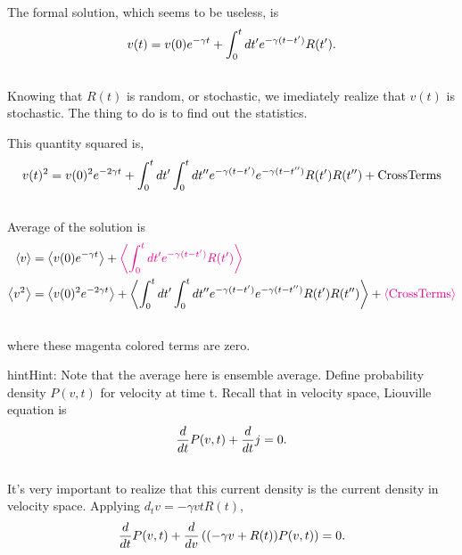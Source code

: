 \documentclass[letterpaper,10pt,english]{sphinxmanual}
\newcommand{\avg}[1]{\left< #1 \right>}
\begin{document}
The formal solution, which seems to be useless, is
\begin{gather}
\begin{split}v(t) = v(0)e^{-\gamma t} + \int_0^t dt' e^{-\gamma (t-t')} R(t') .\end{split}\notag\\\begin{split}\end{split}\notag
\end{gather}
Knowing that $R(t)$ is random, or stochastic, we imediately realize that $v(t)$ is stochastic. The thing to do is to find out the statistics.

This quantity squared is,
\begin{gather}
\begin{split}v(t)^2 = v(0)^2 e^{-2\gamma t} + \int_0^t dt'\int_0^t dt'' e^{-\gamma (t- t')} e^{-\gamma (t - t'')} R(t')R(t'') + \mathrm{Cross Terms}\end{split}\notag\\\begin{split}\end{split}\notag
\end{gather}
Average of the solution is
\begin{gather}
\begin{split}\avg{v} &= \avg{v(0)e^{-\gamma t}} + {\color{magenta}\avg{\int_0^t dt' e^{-\gamma (t-t')} R(t') } } \\
\avg{v^2} &= \avg{v(0)^2 e^{-2\gamma t}} + \avg{\int_0^t dt'\int_0^t dt'' e^{-\gamma (t- t')} e^{-\gamma (t - t'')} R(t')R(t'')} + {\color{magenta}\avg{ \mathrm{Cross Terms}} }\end{split}\notag\\\begin{split}\end{split}\notag
\end{gather}
where these magenta colored terms are zero.

\begin{notice}{hint}{Hint:}
Note that the average here is ensemble average. Define probability density $P(v,t)$ for velocity at time t. Recall that in velocity space, Liouville equation is
\begin{gather}
\begin{split}\frac{d}{dt}P(v,t) + \frac{d}{dt}j = 0.\end{split}\notag\\\begin{split}\end{split}\notag
\end{gather}
It's very important to realize that this current density is the current density in velocity space. Applying $d_t v = -\gamma vt R(t)$,
\begin{gather}
\begin{split}\frac{d}{dt}P(v,t) + \frac{d}{dv} \left(  (-\gamma v+ R(t))P(v,t) \right) = 0 .\end{split}\notag\\\begin{split}\end{split}\notag
\end{gather}\end{notice}
\end{document}
